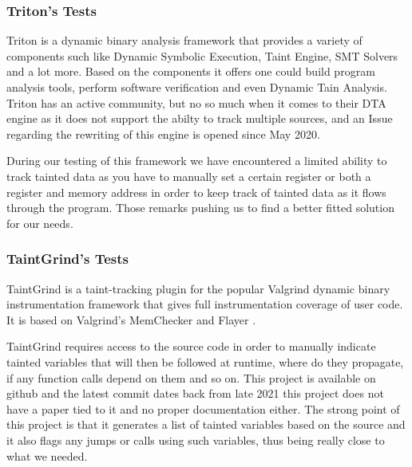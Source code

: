 \documentclass[12pt,a4paper,english,onecolumn]{IEEEtran}
\begin{document}
\subsubsection{Triton's Tests}

Triton \cite{triton} is a dynamic binary analysis framework that provides a variety of components such like Dynamic Symbolic Execution, Taint Engine, SMT Solvers and a lot more. Based on the components it offers one could build program analysis tools, perform software verification and even Dynamic Tain Analysis.
Triton has an active community, but no so much when it comes to their DTA engine as it does not support the abilty to track multiple sources, and an Issue regarding the rewriting of this engine is opened since May 2020.

During our testing of this framework we have encountered a limited ability to track tainted data as you have to manually set a certain register or both a register and memory address in order to keep track of tainted data as it flows through the program. 
Those remarks pushing us to find a better fitted solution for our needs.  

\subsubsection{TaintGrind's Tests}

TaintGrind \cite{taintgrind_repo} \cite{taintgrind} is a taint-tracking plugin for the popular Valgrind \cite{valgrind} dynamic binary instrumentation framework that gives full instrumentation coverage of user code. It is based on Valgrind's MemChecker and Flayer \cite{flayer}.

TaintGrind requires access to the source code in order to manually indicate tainted variables that will then be followed at runtime, where do they propagate, if any function calls depend on them and so on. This project is available on github and the latest commit dates back from late 2021 this project does not have a paper tied to it and no proper documentation either. The strong point of this project is that it generates a list of tainted variables based on the source and it also flags any jumps or calls using such variables, thus being really close to what we needed. 
\end{document}
